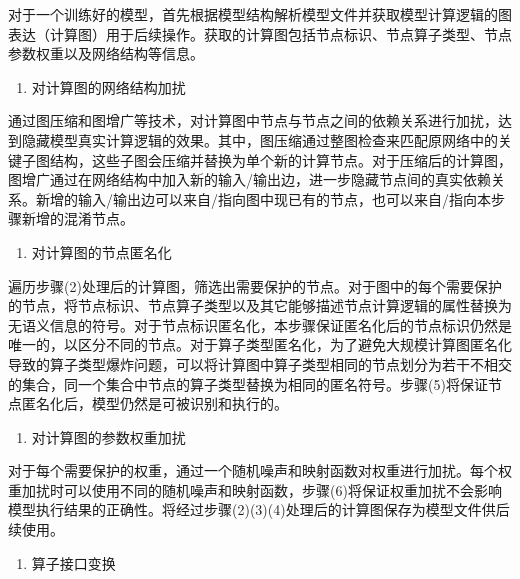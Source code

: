 \documentclass[letterpaper,10pt,english]{sphinxmanual}
\begin{document}
\sphinxAtStartPar
对于一个训练好的模型，首先根据模型结构解析模型文件并获取模型计算逻辑的图表达（计算图）用于后续操作。获取的计算图包括节点标识、节点算子类型、节点参数权重以及网络结构等信息。
\begin{enumerate}
%
\setcounter{enumi}{1}
\item {} 
\sphinxAtStartPar
对计算图的网络结构加扰

\end{enumerate}

\sphinxAtStartPar
通过图压缩和图增广等技术，对计算图中节点与节点之间的依赖关系进行加扰，达到隐藏模型真实计算逻辑的效果。其中，图压缩通过整图检查来匹配原网络中的关键子图结构，这些子图会压缩并替换为单个新的计算节点。对于压缩后的计算图，图增广通过在网络结构中加入新的输入/输出边，进一步隐藏节点间的真实依赖关系。新增的输入/输出边可以来自/指向图中现已有的节点，也可以来自/指向本步骤新增的混淆节点。
\begin{enumerate}
%
\setcounter{enumi}{2}
\item {} 
\sphinxAtStartPar
对计算图的节点匿名化

\end{enumerate}

\sphinxAtStartPar
遍历步骤(2)处理后的计算图，筛选出需要保护的节点。对于图中的每个需要保护的节点，将节点标识、节点算子类型以及其它能够描述节点计算逻辑的属性替换为无语义信息的符号。对于节点标识匿名化，本步骤保证匿名化后的节点标识仍然是唯一的，以区分不同的节点。对于算子类型匿名化，为了避免大规模计算图匿名化导致的算子类型爆炸问题，可以将计算图中算子类型相同的节点划分为若干不相交的集合，同一个集合中节点的算子类型替换为相同的匿名符号。步骤(5)将保证节点匿名化后，模型仍然是可被识别和执行的。
\begin{enumerate}
%
\setcounter{enumi}{3}
\item {} 
\sphinxAtStartPar
对计算图的参数权重加扰

\end{enumerate}

\sphinxAtStartPar
对于每个需要保护的权重，通过一个随机噪声和映射函数对权重进行加扰。每个权重加扰时可以使用不同的随机噪声和映射函数，步骤(6)将保证权重加扰不会影响模型执行结果的正确性。将经过步骤(2)(3)(4)处理后的计算图保存为模型文件供后续使用。
\begin{enumerate}
%
\setcounter{enumi}{4}
\item {} 
\sphinxAtStartPar
算子接口变换

\end{enumerate}
\end{document}

